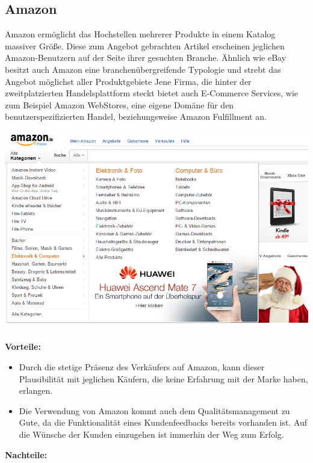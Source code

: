 \documentclass[11pt,a4paper]{article}
\begin{document}
\newpage
\subsection{Amazon}

Amazon ermöglicht das Hochstellen mehrerer Produkte in einem Katalog massiver Größe. Diese zum Angebot gebrachten Artikel erscheinen jeglichen Amazon-Benutzern auf der Seite ihrer gesuchten Branche. Ähnlich wie eBay besitzt auch Amazon eine branchenübergreifende Typologie und strebt das Angebot möglichst aller Produktgebiete
Jene Firma, die hinter der zweitplatzierten Handelsplattform steckt bietet auch E-Commerce Services, wie zum Beispiel Amazon WebStores, eine eigene Domäne für den benutzerspezifizierten Handel, beziehungsweise Amazon Fulfillment an.

\begin{center}
	\includegraphics[width=1.1\textwidth]{amazon-site}
\end{center}

\noindent \textbf{Vorteile:}

\begin{itemize}
	\item Durch die stetige Präsenz des Verkäufers auf Amazon, kann dieser Plausibilität mit jeglichen Käufern, die keine Erfahrung mit der Marke haben, erlangen.
	\item Die Verwendung von Amazon kommt auch dem Qualitätsmanagement zu Gute, da die Funktionalität eines Kundenfeedbacks bereits vorhanden ist. Auf die Wünsche der Kunden einzugehen ist immerhin der Weg zum Erfolg.
\end{itemize}

\noindent \textbf{Nachteile:}
\end{document}
